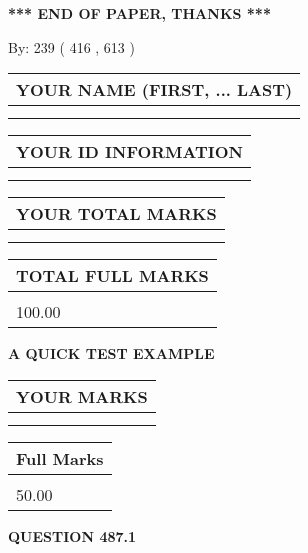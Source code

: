 \documentclass[12pt]{article}
\begin{document}
\vspace{1.0in} 
{\textbf{\large{ *** END OF PAPER, THANKS *** }}} 
   
   
\hspace{1.0in} By: 
 239 ( 416 ,  613 )
   
   
   
   
\newpage 
\setcounter{page}{ 
   487001 } 
   
   
   
   
\noindent\begin{tabular}{|l|}
\hline
YOUR NAME (FIRST, ... LAST)  \\
\hline
 \\ 
 \\ 
\hline
\end{tabular}
\hspace{0.05in} \begin{tabular}{|l|}
\hline
 YOUR   ID   INFORMATION  \\
\hline
 \\ 
 \\ 
\hline
\end{tabular}
   
   
\vspace{0.2in}\noindent\begin{tabular}{|l|}
\hline
YOUR TOTAL MARKS  \\
\hline
 \\ 
 \\ 
\hline
\end{tabular}
\hspace{0.05in} \begin{tabular}{|l|}
\hline
TOTAL FULL MARKS  \\
\hline
 \\ 
100.00 \\
\hline
\end{tabular}
   
   
 \vspace{0.2in}
{\LARGE {\textbf{ A QUICK TEST EXAMPLE}}}
   
   
  
\vspace{0.2in}
  
\noindent\begin{tabular}{|l|}
\hline
 YOUR MARKS  \\
\hline
 \\ 
 \\ 
\hline
\end{tabular}
\hspace{0.05in} \begin{tabular}{|l|}
\hline
 Full Marks  \\
\hline
 \\ 
50.00 \\
\hline
\end{tabular}
{\textbf{\Large{QUESTION
487.1 
}}}
  
\end{document}
